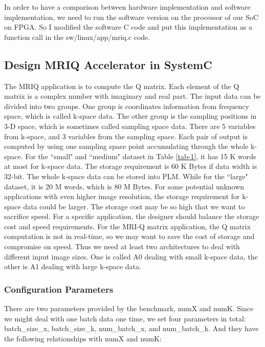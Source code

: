 In order to have a comparison between hardware implementation and software
implementation, we need to run the software version on the processor of our SoC
on FPGA. So I modified the software C code and put this implementation as a
function call in the sw/linux/app/mriq.c code.\\

\subsection{Design MRIQ Accelerator in SystemC}

The MRIQ application is to compute the Q matrix. Each element of the Q matrix is
a complex number with imaginary and real part. The input data can be divided
into two groups. One group is coordinates information from frequency space,
which is called k-space data. The other group is the sampling positions in 3-D
space, which is sometimes called sampling space data. There are 5 variables from
k-space, and 3 variables from the sampling space. Each pair of output is
computed by using one sampling space point accumulating through the whole
k-space. For the ``small" and ``medium" dataset in Table \ref{tab-1}, it has 15
K words at most for k-space data. The storage requirement is 60 K Bytes if data
width is 32-bit. The whole k-space data can be stored into PLM. While for the
``large" dataset, it is 20 M words, which is 80 M Bytes. For some potential
unknown applications with even higher image resolution, the storage requirement
for k-space data could be larger. The storage cost may be so high that we want
to sacrifice speed. For a specific application, the designer should balance the
storage cost and speed requirements. For the MRI-Q matrix application, the Q
matrix computation is not in real-time, so we may want to save the cost of
storage and compromise on speed. Thus we need at least two architectures to deal
with different input image sizes. One is called A0 dealing with small k-space
data, the other is A1 dealing with large k-space data.\\



\subsubsection{Configuration Parameters}

There are two parameters provided by the benchmark, numX and numK. Since we
might deal with one batch data one time, we set four parameters in total:
batch\_size\_x, batch\_size\_k, num\_batch\_x, and num\_batch\_k. And they have
the following relationships with numX and numK:

